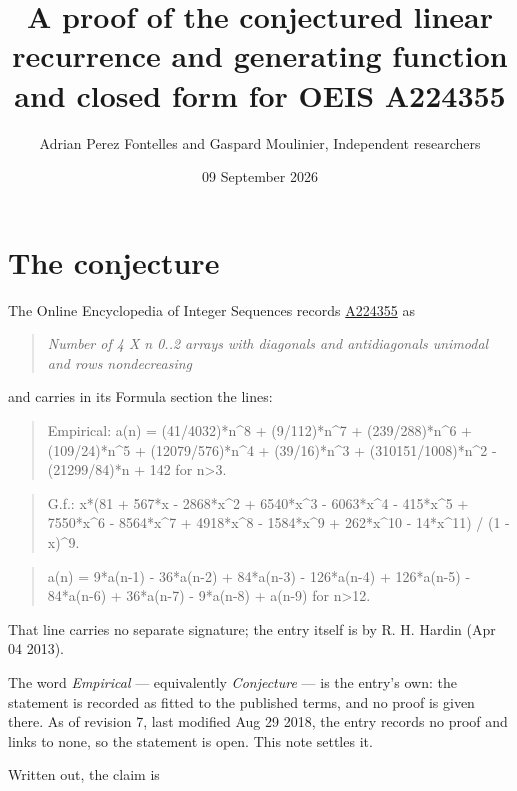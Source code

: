 \documentclass[11pt]{article}
\title{A proof of the conjectured linear recurrence and generating function and closed form for OEIS A224355}
\author{Adrian Perez Fontelles and Gaspard Moulinier, Independent researchers}
\date{09 September 2026}
\theoremstyle{definition}
\begin{document}
\maketitle
\section{The conjecture}

The Online Encyclopedia of Integer Sequences records \href{https://oeis.org/A224355}{A224355} as

\begin{quote}\itshape Number of 4 X n 0..2 arrays with diagonals and antidiagonals unimodal and rows nondecreasing\end{quote}

and carries in its Formula section the lines:

\begin{quote}\ttfamily Empirical: a(n) = (41/4032)*n\textasciicircum{}8 + (9/112)*n\textasciicircum{}7 + (239/288)*n\textasciicircum{}6 + (109/24)*n\textasciicircum{}5 + (12079/576)*n\textasciicircum{}4 + (39/16)*n\textasciicircum{}3 + (310151/1008)*n\textasciicircum{}2 - (21299/84)*n + 142 for n>3.\end{quote}

\begin{quote}\ttfamily G.f.: x*(81 + 567*x - 2868*x\textasciicircum{}2 + 6540*x\textasciicircum{}3 - 6063*x\textasciicircum{}4 - 415*x\textasciicircum{}5 + 7550*x\textasciicircum{}6 - 8564*x\textasciicircum{}7 + 4918*x\textasciicircum{}8 - 1584*x\textasciicircum{}9 + 262*x\textasciicircum{}10 - 14*x\textasciicircum{}11) / (1 - x)\textasciicircum{}9.\end{quote}

\begin{quote}\ttfamily a(n) = 9*a(n-1) - 36*a(n-2) + 84*a(n-3) - 126*a(n-4) + 126*a(n-5) - 84*a(n-6) + 36*a(n-7) - 9*a(n-8) + a(n-9) for n>12.\end{quote}

That line carries no separate signature; the entry itself is by R. H. Hardin (Apr 04 2013).

The word {\itshape Empirical} --- equivalently {\itshape Conjecture} --- is the entry's own: the statement is recorded as fitted to the published terms, and no proof is given there. As of revision 7, last modified Aug 29 2018, the entry records no proof and links to none, so the statement is open. This note settles it.

Written out, the claim is
\end{document}
